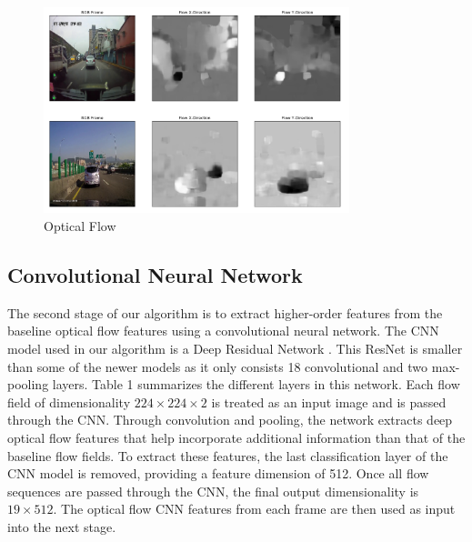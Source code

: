 \documentclass[10pt, conference, compsocconf]{IEEEtran}
\begin{document}
\begin{figure}[!t]
\centering
\includegraphics[width=3.5in]{images/flow}
\caption{Optical Flow}
\label{flow}
\end{figure}

\subsection{Convolutional Neural Network}
The second stage of our algorithm is to extract higher-order features from the baseline optical flow features using a convolutional neural network. The CNN model used in our algorithm is a Deep Residual Network \cite{DBLP:journals/corr/HeZRS15}. This ResNet is smaller than some of the newer models as it only consists 18 convolutional and two max-pooling layers. Table 1 summarizes the different layers in this network. Each flow field of dimensionality $224\times224\times2$ is treated as an input image and is passed through the CNN. Through convolution and pooling, the network extracts deep optical flow features that help incorporate additional information than that of the baseline flow fields. To extract these features, the last classification layer of the CNN model is removed, providing a feature dimension of 512. Once all flow sequences are passed through the CNN, the final output dimensionality is $19\times512$. The optical flow CNN features from each frame are then used as input into the next stage.
\end{document}
